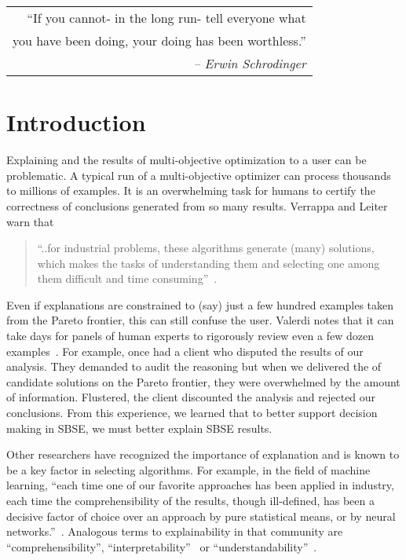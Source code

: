 \documentclass[runningheads]{llncs}
\makeatletter
\newenvironment{myepigraph}
  {\par\hfill\itshape
   \begin{tabular}{@{}r@{}}} %
  {\end{tabular}\par\medskip}
\makeatother
\begin{document}
\begin{myepigraph}
``If you cannot- in the long run- tell  everyone what \\
 you have been doing, your  doing has been worthless.''\\
 {\em-- Erwin Schrodinger}

\end{myepigraph}

\section{Introduction}
Explaining and the results of
multi-objective optimization to a user
can be problematic.
A typical run of a multi-objective optimizer
can process thousands to millions of examples.
It is an overwhelming task for humans to
certify the correctness of conclusions generated
from so many results. Verrappa and Leiter warn that
\begin{quote}
``..for industrial problems, these algorithms generate
(many) solutions, which makes the tasks of
understanding them and selecting one among them
difficult and time consuming''~\cite{veer11}.
\end{quote}
Even if explanations are constrained to
 (say) just a few hundred examples taken from the Pareto
frontier, this can still confuse the user.
 Valerdi notes that it can take days for
panels of human experts to rigorously review even a few dozen
examples~\cite{valerdi11}.  
For example, once had a 
client who disputed the results of our  analysis.
They
demanded to  audit the reasoning but
 when we delivered the 
of candidate solutions on the Pareto frontier,
they were overwhelmed by
the amount of information.  Flustered,
the client discounted the  analysis
and rejected our conclusions. From this experience, we learned that
to better support decision making in SBSE, we must better explain
SBSE results.

Other researchers have recognized the importance
of explanation and is known to be a key factor in selecting algorithms.
For example, in the field of machine learning,
``each time one of our favorite 
approaches has been applied in industry, each time the
comprehensibility of the results, though ill-defined, has
been a decisive factor of choice over an approach by pure
statistical means, or by neural networks.''~\cite{ag98}.
Analogous terms to explainability  in that community 
are ``comprehensibility'',
``interpretability''~\cite{maimon05} or ``understandability''~\cite{allahyari:user-oriented}.
\end{document}
